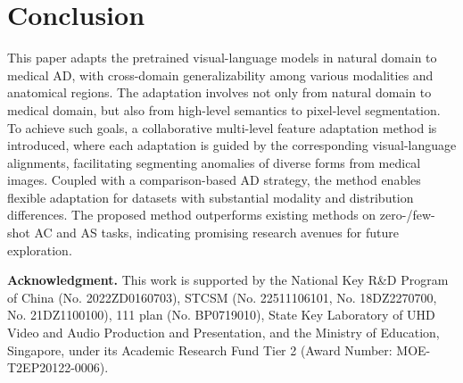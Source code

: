 \section{Conclusion}
This paper adapts the pretrained visual-language models in natural domain to medical AD, with cross-domain generalizability among various modalities and anatomical regions. 
The adaptation involves not only from natural domain to medical domain, but also from high-level semantics to pixel-level segmentation. 
To achieve such goals, a collaborative multi-level feature adaptation method is introduced, where each adaptation is guided by the corresponding visual-language alignments, facilitating segmenting anomalies of diverse forms from medical images.
Coupled with a comparison-based AD strategy, the method enables flexible adaptation for datasets with substantial modality and distribution differences. 
The proposed method outperforms existing methods on zero-/few-shot AC and AS tasks, indicating promising research avenues for future exploration.

\noindent\textbf{Acknowledgment.} This work is supported by the National Key R\&D Program of China (No. 2022ZD0160703), STCSM (No. 22511106101, No. 18DZ2270700, No. 21DZ1100100), 111 plan (No. BP0719010), State Key Laboratory of UHD Video and Audio Production and Presentation,
and the Ministry of Education, Singapore, under its Academic Research Fund Tier 2 (Award Number: MOE-T2EP20122-0006).